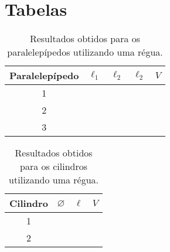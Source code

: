 \section{Tabelas}

\begin{table*}[!htpb]
	\label{TabelaDadosRegua}
	\begin{center}
	\begin{tabular}{cp{25mm}p{25mm}p{25mm}p{25mm}}
		\toprule
		Paralelepípedo & $\ell_1$ & $\ell_2$ & $\ell_2$ & $V$  \\
		\midrule	
		\cellcolor[gray]{0.89}1 & \cellcolor[gray]{0.92} & \cellcolor[gray]{0.89} & \cellcolor[gray]{0.92} & \cellcolor[gray]{0.89}\\
		\cellcolor[gray]{0.95}2 & \cellcolor[gray]{0.97} & \cellcolor[gray]{0.95} & \cellcolor[gray]{0.97} & \cellcolor[gray]{0.95}\\
		\cellcolor[gray]{0.89}3 & \cellcolor[gray]{0.92} & \cellcolor[gray]{0.89} & \cellcolor[gray]{0.92} & \cellcolor[gray]{0.89}\\
		\bottomrule
	\end{tabular}
	\end{center}
	\caption{Resultados obtidos para os paralelepípedos utilizando uma régua.}
\end{table*}

\begin{table*}[!htpb]
    \begin{center}
	\label{TabelaDadosReguaCil}
	\begin{tabular}{cp{25mm}p{25mm}p{25mm}}
		\toprule
		Cilindro & $\diameter$ & $\ell$ & $V$  \\
		\midrule
		\cellcolor[gray]{0.89} 1 & \cellcolor[gray]{0.92} & \cellcolor[gray]{0.89} & \cellcolor[gray]{0.92} \\
		\cellcolor[gray]{0.95} 2 & \cellcolor[gray]{0.97} & \cellcolor[gray]{0.95} & \cellcolor[gray]{0.97} \\
		\bottomrule
	\end{tabular}
	\end{center}
	\caption{Resultados obtidos para os cilindros utilizando uma régua.}
\end{table*}

